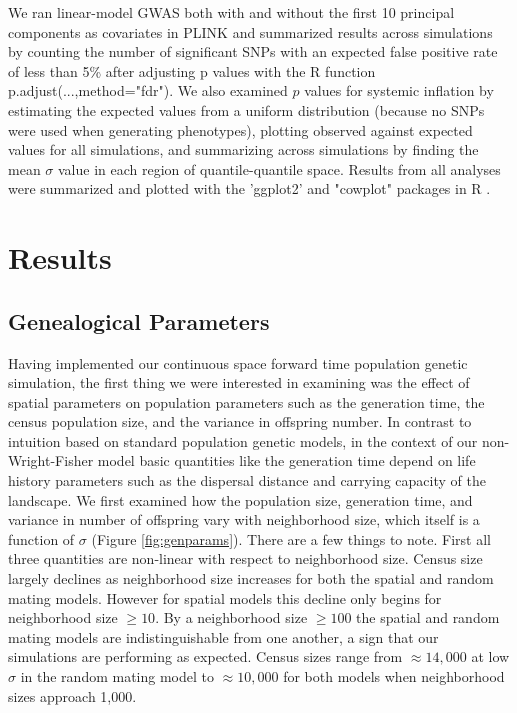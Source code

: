 \documentclass[11pt,twoside,lineno]{preprint}
\begin{document}
We ran linear-model GWAS both with and without the first 10 principal components as covariates in PLINK and summarized results across simulations by counting the number of significant SNPs with an expected false positive rate of less than 5\% after adjusting p values with the R function p.adjust(...,method="fdr"). We also examined $p$ values for systemic inflation by estimating the expected values from a uniform distribution (because no SNPs were used when generating phenotypes), plotting observed against expected values for all simulations, and summarizing across simulations by finding the mean $\sigma$ value in each region of quantile-quantile space. Results from all analyses were summarized and plotted with the 'ggplot2' \citep{Wickham2016} and "cowplot" \citep{Wilke2019} packages in R \citep{Rcore2018}. 

\section{Results}

\subsection{Genealogical Parameters}
Having implemented our continuous space forward time population genetic simulation, the first thing we were interested in examining was the effect of spatial parameters on population parameters such as the generation time, the census population size, and the variance in offspring number. In contrast to intuition based on standard population genetic models, in the context of our non-Wright-Fisher model basic quantities like the generation time depend on life history parameters such as the dispersal distance and carrying capacity of the landscape. We first examined how the population size, generation time, and  variance in number of offspring vary with neighborhood size, which itself is a function of $\sigma$ (Figure \ref{fig:genparams}). There are a few things to note. First all three quantities are non-linear with respect to neighborhood size. Census size largely declines as neighborhood size increases for both the spatial and random mating models. However for spatial models this decline only begins for neighborhood size $\geq 10$. By a neighborhood size $\geq 100$ the spatial and random mating models are indistinguishable from one another, a sign that our simulations are performing as expected. Census sizes range from $\approx 14,000$ at low $\sigma$ in the random mating model to $\approx 10,000$ for both models when neighborhood sizes approach 1,000.
\end{document}
